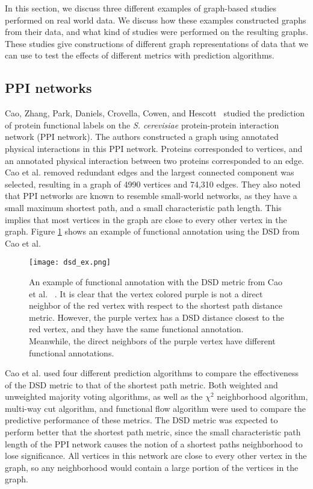 In this section, we discuss three different examples of graph-based studies performed on real world data. We discuss how these examples constructed graphs from their data, and what kind of studies were performed on the resulting graphs. These studies give constructions of different graph representations of data that we can use to test the effects of different metrics with prediction algorithms.

\subsection{PPI networks}
Cao, Zhang, Park, Daniels, Crovella, Cowen, and Hescott~\cite{10.1371/journal.pone.0076339} studied the prediction of protein functional labels on the \emph{S. cerevisiae} protein-protein interaction network (PPI network). The authors constructed a graph using annotated physical interactions in this PPI network. Proteins corresponded to vertices, and an annotated physical interaction between two proteins corresponded to an edge. Cao et al. removed redundant edges and the largest connected component was selected, resulting in a graph of 4990 vertices and 74,310 edges. They also noted that PPI networks are known to resemble small-world networks, as they have a small maximum shortest path, and a small characteristic path length. This implies that most vertices in the graph are close to every other vertex in the graph. Figure \ref{fig:PPI_example} shows an example of functional annotation using the DSD from Cao et al.

\begin{figure}[h]
\centering
\texttt{[image: dsd\_ex.png]}
\caption{An example of functional annotation with the DSD metric from Cao et al. ~\cite{10.1371/journal.pone.0076339}. It is clear that the vertex colored purple is not a direct neighbor of the red vertex with respect to the shortest path distance metric. However, the purple vertex has a DSD distance closest to the red vertex, and they have the same functional annotation. Meanwhile, the direct neighbors of the purple vertex have different functional annotations.}
\label{fig:PPI_example}
\end{figure}

Cao et al. used four different prediction algorithms to compare the effectiveness of the DSD metric to that of the shortest path metric. Both weighted and unweighted majority voting algorithms, as well as the $\chi^{2}$ neighborhood algorithm, multi-way cut algorithm, and functional flow algorithm were used to compare the predictive performance of these metrics. The DSD metric was expected to perform better that the shortest path metric, since the small characteristic path length of the PPI network causes the notion of a shortest paths neighborhood to lose significance. All vertices in this network are close to every other vertex in the graph, so any neighborhood would contain a large portion of the vertices in the graph.

